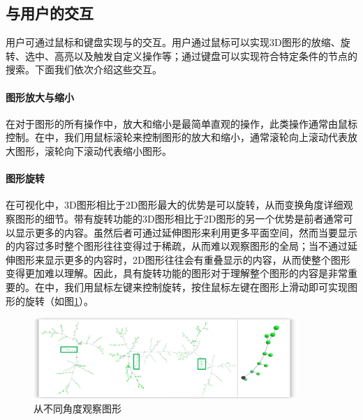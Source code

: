 
\subsection{与用户的交互}
用户可通过鼠标和键盘实现与的交互。用户通过鼠标可以实现3D图形的放缩、旋转、选中、高亮以及触发自定义操作等；通过键盘可以实现符合特定条件的节点的搜索。下面我们依次介绍这些交互。
\paragraph{图形放大与缩小}
在对于图形的所有操作中，放大和缩小是最简单直观的操作，此类操作通常由鼠标控制。在中，我们用鼠标滚轮来控制图形的放大和缩小，通常滚轮向上滚动代表放大图形，滚轮向下滚动代表缩小图形。
\paragraph{图形旋转}
在可视化中，3D图形相比于2D图形最大的优势是可以旋转，从而变换角度详细观察图形的细节。带有旋转功能的3D图形相比于2D图形的另一个优势是前者通常可以显示更多的内容。虽然后者可通过延伸图形来利用更多平面空间，然而当要显示的内容过多时整个图形往往变得过于稀疏，从而难以观察图形的全局；当不通过延伸图形来显示更多的内容时，2D图形往往会有重叠显示的内容，从而使整个图形变得更加难以理解。因此，具有旋转功能的图形对于理解整个图形的内容是非常重要的。在中，我们用鼠标左键来控制旋转，按住鼠标左键在图形上滑动即可实现图形的旋转（如图\ref{vmdv:prooftree:different:angle}）。

\begin{figure}[h!]
	\centering
	\caption{从不同角度观察图形}
	\label{vmdv:prooftree:different:angle}
	\includegraphics[width=10cm]{Img/phi_prooftreegraph_angles.png}
	
\end{figure}
